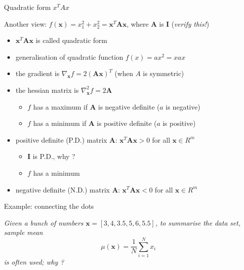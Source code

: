 \documentclass[ignorenonframetext,]{beamer}
\providecommand{\tightlist}{%
  \setlength{\itemsep}{0pt}\setlength{\parskip}{0pt}}
\newcommand{\vv}[1]{\boldsymbol{#1}}
\begin{document}
\begin{frame}{Quadratic form \(x^TAx\)}
\protect\hypertarget{quadratic-form-xtax}{}

Another view: \(f(\vv{x}) = x_1^2 +x_2^2= \vv{x}^T \vv{A} \vv{x}\),
where \(\vv{A}\) is \(\vv{I}\) (\emph{verify this!})

\begin{itemize}
\tightlist
\item
  \(\vv{x}^T\vv{Ax}\) is called quadratic form
\item
  generalisation of quadratic function \(f(x) = ax^2 = xax\)
\item
  the gradient is \(\nabla_{\vv{x}} f = 2(\vv{A}\vv{x})^T\) (when \(A\)
  is symmetric)
\item
  the hessian matrix is \(\nabla_{\vv{x}}^2 f = 2\vv{A}\)

  \begin{itemize}
  \tightlist
  \item
    \(f\) has a maximum if \(\vv{A}\) is negative definite (\(a\) is
    negative)
  \item
    \(f\) has a minimum if \(\vv{A}\) is positive definite (\(a\) is
    positive)
  \end{itemize}
\item
  positive definite (P.D.) matrix \(\vv{A}\): \(\vv{x}^T\vv{Ax} >0\) for
  all \(\vv{x}\in R^m\)

  \begin{itemize}
  \tightlist
  \item
    \(\vv{I}\) is P.D., why ?
  \item
    \(f\) has a minimum
  \end{itemize}
\item
  negative definite (N.D.) matrix \(\vv{A}\): \(\vv{x}^T\vv{Ax} <0\) for
  all \(\vv{x}\in R^m\)
\end{itemize}

\end{frame}

\begin{frame}{Example: connecting the dots}
\protect\hypertarget{example-connecting-the-dots}{}

\emph{Given a bunch of numbers \(\vv{x} = [3, 4, 3.5, 5, 6, 5.5]\), to
summarise the data set, sample mean
\[\mu(\vv{x}) = \frac{1}{N} \sum_{i=1}^N {x_i}\] is often used; why ? }

\end{frame}
\end{document}
